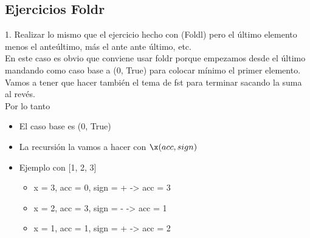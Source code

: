 \documentclass[10pt,a4paper]{article}
\begin{document}
\subsection*{Ejercicios Foldr}
1. Realizar lo mismo que el ejercicio hecho con (Foldl) pero el último elemento menos el anteúltimo, más el ante ante último, etc. \\
En este caso es obvio que conviene usar foldr porque empezamos desde el último mandando como caso base a (0, True) para colocar mínimo el primer elemento. \\
Vamos a tener que hacer también el tema de fst para terminar sacando la suma al revés. \\
Por lo tanto 
\begin{itemize}
    \item El caso base es (0, True)
    \item La recursión la vamos a hacer con $\x (acc, sign)$
    \item Ejemplo con [1, 2, 3]
    \begin{itemize}
        \item x = 3, acc = 0, sign = + -> acc = 3
        \item x = 2, acc = 3, sign = - -> acc = 1
        \item x = 1, acc = 1, sign = + -> acc = 2
    \end{itemize}
\end{itemize}
\end{document}
